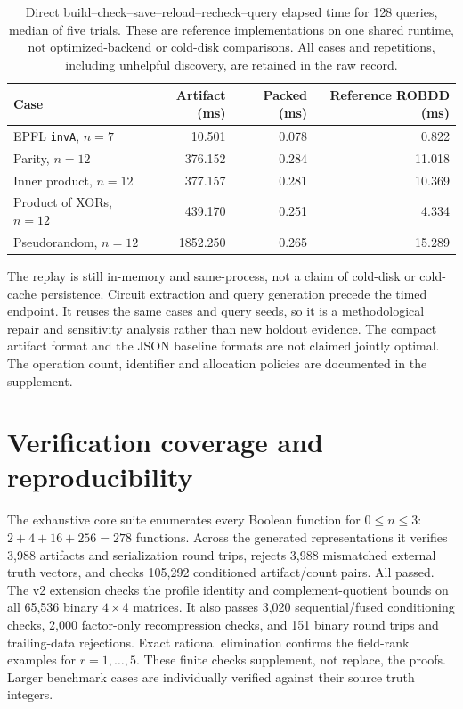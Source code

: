 \documentclass[11pt]{article}
\theoremstyle{definition}\newtheorem{definition}[theorem]{Definition}
\theoremstyle{remark}\newtheorem{remark}[theorem]{Remark}
\begin{document}
\begin{table}[ht]
\centering\small
\begin{tabular}{@{}lrrr@{}}\toprule
Case & Artifact (ms) & Packed (ms) & Reference ROBDD (ms)\\\midrule
EPFL \texttt{invA}, $n=7$ & 10.501 & 0.078 & 0.822\\
Parity, $n=12$ & 376.152 & 0.284 & 11.018\\
Inner product, $n=12$ & 377.157 & 0.281 & 10.369\\
Product of XORs, $n=12$ & 439.170 & 0.251 & 4.334\\
Pseudorandom, $n=12$ & 1852.250 & 0.265 & 15.289\\\bottomrule
\end{tabular}
\caption{Direct build--check--save--reload--recheck--query elapsed time for 128 queries, median of five trials. These are reference implementations on one shared runtime, not optimized-backend or cold-disk comparisons. All cases and repetitions, including unhelpful discovery, are retained in the raw record.}\label{tab:replay}
\end{table}

The replay is still in-memory and same-process, not a claim of cold-disk or cold-cache persistence. Circuit extraction and query generation precede the timed endpoint. It reuses the same cases and query seeds, so it is a methodological repair and sensitivity analysis rather than new holdout evidence. The compact artifact format and the JSON baseline formats are not claimed jointly optimal. The operation count, identifier and allocation policies are documented in the supplement.

\section{Verification coverage and reproducibility}
The exhaustive core suite enumerates every Boolean function for $0\le n\le3$: $2+4+16+256=278$ functions. Across the generated representations it verifies 3,988 artifacts and serialization round trips, rejects 3,988 mismatched external truth vectors, and checks 105,292 conditioned artifact/count pairs. All passed. The v2 extension checks the profile identity and complement-quotient bounds on all 65,536 binary $4\times4$ matrices. It also passes 3,020 sequential/fused conditioning checks, 2,000 factor-only recompression checks, and 151 binary round trips and trailing-data rejections. Exact rational elimination confirms the field-rank examples for $r=1,\ldots,5$. These finite checks supplement, not replace, the proofs. Larger benchmark cases are individually verified against their source truth integers.
\end{document}
